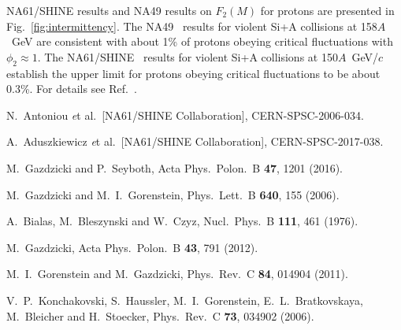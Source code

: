\documentclass{PoS}
\begin{document}
NA61/SHINE results and NA49 results on $F_2(M)$ for protons are presented in Fig.~\ref{fig:intermittency}.
The NA49~\cite{Anticic:2012xb} results for violent Si+A collisions at 158$A$~GeV 
are consistent with about 1\% of protons obeying critical fluctuations 
with $\phi_2 \approx 1$.
The NA61/SHINE~\cite{sr2017} results for violent Si+A collisions at 150$A$~GeV/$c$ establish 
the upper limit for protons obeying critical fluctuations 
to be about 0.3\%. For details see Ref.~\cite{davis-cpod}.

\clearpage





\begin{thebibliography}{99}

N.~Antoniou {\textit et al.}\ [NA61/SHINE Collaboration],
CERN-SPSC-2006-034.
	
A.~Aduszkiewicz {\textit et al.}\ [NA61/SHINE Collaboration],
CERN-SPSC-2017-038.	
	
M.~Gazdzicki and P.~Seyboth,
Acta Phys.\ Polon.\ B {\bf 47}, 1201 (2016).

	
M.~Gazdzicki and M.~I.~Gorenstein,
Phys.\ Lett.\ B {\bf 640}, 155 (2006).

	
A.~Bialas, M.~Bleszynski and W.~Czyz,
Nucl.\ Phys.\ B {\bf 111}, 461 (1976).

M.~Gazdzicki,
Acta Phys.\ Polon.\ B {\bf 43}, 791 (2012).


M.~I.~Gorenstein and M.~Gazdzicki,
Phys.\ Rev.\ C {\bf 84}, 014904 (2011).


V.~P.~Konchakovski, S.~Haussler, M.~I.~Gorenstein, E.~L.~Bratkovskaya, M.~Bleicher and H.~Stoecker,
Phys.\ Rev.\ C {\bf 73}, 034902 (2006).





\end{thebibliography}
\end{document}
